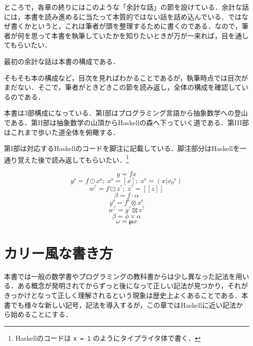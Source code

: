 \documentclass[a4paper,draft]{jsbook}
\def\[{\left[\!\left[}
\def\]{\right]\!\right]}
\newcommand{\programminglanguage}[1]{\textsf{#1}}
\newcommand{\haskell}{\programminglanguage{Haskell}}
\newenvironment{leader}{\begingroup}{\endgroup}
\newcommand{\code}[1]{\texttt{#1}}
\newcommand{\mType}[1]{\mathbf{#1}}
\newcommand{\mListType}[1]{[\mType{#1}]}
\newcommand{\mMaybeType}[1]{\[\mType{#1}\]}
\newcommand{\mTypeConstructor}[1]{\mathit{#1}} %
\newcommand{\mListWith}[1]{\left[#1\right]}
\newcommand{\mMaybeWith}[1]{\[#1\]}
\newcommand{\mList}[1]{{#1}^\mathrm{s}}
\newcommand{\mMaybe}[1]{{#1}^\text{?}}
\DeclareMathOperator{\mMap}{\cdot}
\DeclareMathOperator{\mMapList}{\odot}
\DeclareMathOperator{\mMapMaybe}{\boxdot}
\DeclareMathOperator{\mApplicativeMap}{\times}
\DeclareMathOperator{\mApplicativeMapList}{\otimes}
\DeclareMathOperator{\mApplicativeMapMaybe}{\boxtimes}
\DeclareMathOperator{\mListTypeConstructor}{\mTypeConstructor{List}}
\DeclareMathOperator{\mMaybeTypeConstructor}{\mTypeConstructor{Maybe}}
\begin{document}
ところで，各章の終りにはこのような「余計な話」の節を設けている．余計な話には，本書を読み進めるに当たって本質的ではない話を詰め込んでいる．ではなぜ書くかというと，これは筆者が頭を整理するために書くのである．なので，筆者が何を思って本書を執筆していたかを知りたいときが万が一来れば，目を通してもらいたい．

最初の余計な話は本書の構成である．

そもそも本の構成など，目次を見ればわかることであるが，執筆時点では目次がまだない．そこで，筆者がときどきこの節を読み返し，全体の構成を確認しているのである．

本書は3部構成になっている．第I部はプログラミング言語から抽象数学への登山である．第II部は抽象数学の山頂から\haskell の森へ下っていく道である．第III部はこれまで歩いた道全体を俯瞰する．

第I部は対応する\haskell のコードを脚注に記載している．脚注部分は\haskell を一通り覚えた後で読み返してもらいたい．\footnote{\haskell のコードは \code{x = 1} のようにタイプライタ体で書く．}

% 




$$y=fx$$
$$\mList{y}=f\mMapList\mList{x};\;
\mList{x}=\mListWith{x};\;
\mList{x}=(x|\mList{x_0})$$
$$\mMaybe{w}=f\mMapMaybe\mMaybe{z};\;
\mMaybe{z}=\mMaybeWith{z}$$
$$\beta=f\mMap\alpha$$
$$\mList{y}=\mList{f}\mApplicativeMapList\mList{x}$$
$$\mMaybe{w}=\mMaybe{g}\mApplicativeMapMaybe\mMaybe{z}$$
$$\beta=\phi\mApplicativeMap\alpha$$
$$\omega={\boldsymbol\mu}x$$


\chapter{カリー風な書き方}
\begin{leader}
本書では一般の数学書やプログラミングの教科書からは少し異なった記法を用いる．ある概念が発明されてからずっと後になって正しい記法が見つかり，それがきっかけとなって正しく理解されるという現象は歴史上よくあることである．本書でも様々な新しい記号，記法を導入するが，この章では\haskell に近い記法から始めることにする．
\end{leader}
\end{document}
